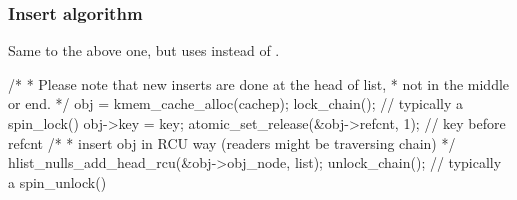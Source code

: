 \subsubsection{Insert algorithm}

Same to the above one, but uses  instead of
.

\begin{VerbatimU}
	/*
	 * Please note that new inserts are done at the head of list,
	 * not in the middle or end.
	 */
	obj = kmem_cache_alloc(cachep);
	lock_chain(); // typically a spin_lock()
	obj->key = key;
	atomic_set_release(&obj->refcnt, 1); // key before refcnt
	/*
	 * insert obj in RCU way (readers might be traversing chain)
	 */
	hlist_nulls_add_head_rcu(&obj->obj_node, list);
	unlock_chain(); // typically a spin_unlock()
\end{VerbatimU}
